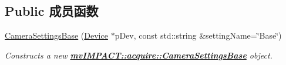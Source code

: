 \subsection*{Public 成员函数}
\begin{DoxyCompactItemize}
\item 
\hyperlink{classmv_i_m_p_a_c_t_1_1acquire_1_1_camera_settings_base_a48c2eadebe65f845c04cf014703e725a}{Camera\+Settings\+Base} (\hyperlink{classmv_i_m_p_a_c_t_1_1acquire_1_1_device}{Device} $\ast$p\+Dev, const std\+::string \&setting\+Name=\char`\"{}Base\char`\"{})
\begin{DoxyCompactList}\small\item\em Constructs a new {\bfseries \hyperlink{classmv_i_m_p_a_c_t_1_1acquire_1_1_camera_settings_base}{mv\+I\+M\+P\+A\+C\+T\+::acquire\+::\+Camera\+Settings\+Base}} object. \end{DoxyCompactList}\end{DoxyCompactItemize}
